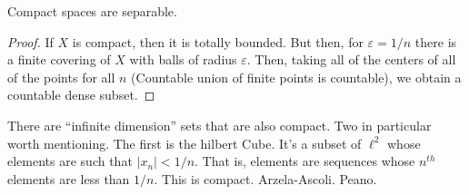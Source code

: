 \documentclass[crop=false,class=article,oneside]{standalone}
\begin{document}
                \begin{theorem}
                    Compact spaces are separable.
                \end{theorem}
                \begin{proof}
                    If $X$ is compact, then
                    it is totally bounded. But
                    then, for $\varepsilon=1/n$
                    there is a finite covering of
                    $X$ with balls of radius
                    $\varepsilon$. Then,
                    taking all of the
                    centers of all of the points
                    for all $n$ (Countable union
                    of finite points is countable),
                    we obtain a countable dense
                    subset.
                \end{proof}
                \begin{example}
                    There are ``infinite dimension''
                    sets that are also compact. Two
                    in particular worth mentioning.
                    The first is the hilbert Cube.
                    It's a subset of $\ell^{2}$
                    whose elements are such that
                    $|x_{n}|<1/n$. That is, elements
                    are sequences whose $n^{th}$
                    elements are less than
                    $1/n$. This is compact.
                    Arzela-Ascoli. Peano.
                \end{example}
\end{document}
